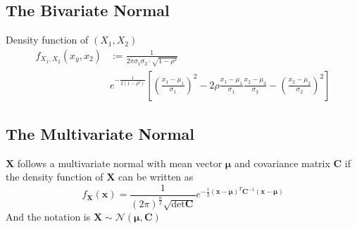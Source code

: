 \documentclass[11pt]{article}
\theoremstyle{definition}
\begin{document}
\subsection{The Bivariate Normal}

Density function of $(X_1,X_2)$
\begin{align*}
	f_{X_1, X_2}(x_y,x_2) &:= \frac{1}{2\pi\sigma_1\sigma_2\cdot\sqrt{1-\rho^2}}\\
	& e^{-\frac{1}{2(1-\rho^2)}} \left[ \left(\frac{x_1 - \mu_1}{\sigma_1}\right)^2 - 2 \rho\frac{x_1 - \mu_1}{\sigma_1}\frac{x_2- \mu_2}{\sigma_2} - \left(\frac{x_2 - \mu_2}{\sigma_2}\right)^2 \right]
\end{align*}


\subsection{The Multivariate Normal}
$\textbf{X}$ follows a multivariate normal with mean vector $\bm{\mu}$ and covariance matrix $\textbf{C}$ if the density function of $\textbf{X}$ can be written as
\begin{equation*}
	f_{\textbf{X}}(\textbf{x}) = \frac{1}{(2\pi)^{\frac{n}{2}}\sqrt{\det \textbf{C}}} e^{- \frac{1}{2} (\textbf{x}-\bm{\mu})^T \textbf{C}^{-1}(\textbf{x}-\bm{\mu})}
\end{equation*}
And the notation is $\textbf{X}\sim \mathcal{N}(\bm{\mu}, \textbf{C})$
\end{document}
